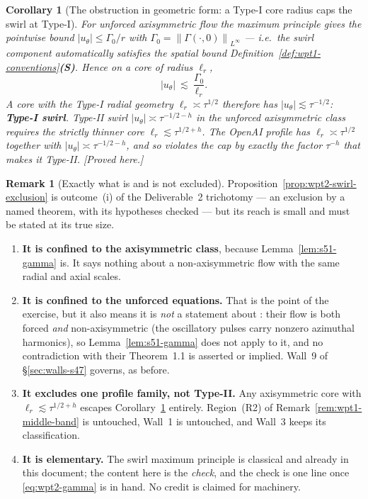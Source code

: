 \documentclass[11pt]{article}
\newtheorem{corollary}[theorem]{Corollary}
\theoremstyle{definition}
\newtheorem{remark}[theorem]{Remark}
\theoremstyle{remark}
\newcommand{\norm}[1]{\left\|#1\right\|}
\newcommand{\abs}[1]{\left|#1\right|}
\begin{document}
\begin{corollary}[The obstruction in geometric form: a Type-I core radius
  caps the swirl at Type-I]\label{cor:wpt2-radius-cap}
  For unforced axisymmetric flow the maximum principle gives the pointwise
  bound $\abs{u_\theta}\leq\Gamma_0/r$ with
  $\Gamma_0=\norm{\Gamma(\cdot,0)}_{L^\infty}$ --- i.e.\ the swirl component
  \emph{automatically} satisfies the spatial bound
  Definition~\ref{def:wpt1-conventions}\textbf{(S)}. Hence on a core of
  radius $\ell_r$,
  \[
    \abs{u_\theta}\ \lesssim\ \frac{\Gamma_0}{\ell_r}.
  \]
  A core with the Type-I radial geometry $\ell_r\asymp\tau^{1/2}$ therefore
  has $\abs{u_\theta}\lesssim\tau^{-1/2}$: \textbf{Type-I swirl}. Type-II
  swirl $\abs{u_\theta}\asymp\tau^{-1/2-h}$ in the unforced axisymmetric
  class requires the strictly thinner core $\ell_r\lesssim\tau^{1/2+h}$. The
  OpenAI profile has $\ell_r\asymp\tau^{1/2}$ together with
  $\abs{u_\theta}\asymp\tau^{-1/2-h}$, and so violates the cap by exactly
  the factor $\tau^{-h}$ that makes it Type-II. \emph{[Proved here.]}
\end{corollary}

\begin{remark}[Exactly what is and is not excluded]
  \label{rem:wpt2-exclusion-scope}
  Proposition~\ref{prop:wpt2-swirl-exclusion} is outcome~(i) of the
  Deliverable~2 trichotomy --- an exclusion by a named theorem, with its
  hypotheses checked --- but its reach is small and must be stated at its
  true size.
  \begin{enumerate}[label=(\alph*)]
    \item \textbf{It is confined to the axisymmetric class}, because
      Lemma~\ref{lem:s51-gamma} is. It says nothing about a non-axisymmetric
      flow with the same radial and axial scales.
    \item \textbf{It is confined to the unforced equations.} That is the
      point of the exercise, but it also means it is \emph{not} a statement
      about \cite{OpenAI2026}: their flow is both forced \emph{and}
      non-axisymmetric (the oscillatory pulses carry nonzero azimuthal
      harmonics), so Lemma~\ref{lem:s51-gamma} does not apply to it, and
      no contradiction with their Theorem~1.1 is asserted or implied.
      Wall~9 of \S\ref{sec:walls-s47} governs, as before.
    \item \textbf{It excludes one profile family, not Type-II.} Any
      axisymmetric core with $\ell_r\lesssim\tau^{1/2+h}$ escapes
      Corollary~\ref{cor:wpt2-radius-cap} entirely. Region~(R2) of
      Remark~\ref{rem:wpt1-middle-band} is untouched, Wall~1 is untouched,
      and Wall~3 keeps its classification.
    \item \textbf{It is elementary.} The swirl maximum principle is
      classical and already in this document; the content here is the
      \emph{check}, and the check is one line once
      \eqref{eq:wpt2-gamma} is in hand. No credit is claimed for machinery.
  \end{enumerate}
\end{remark}
\end{document}
